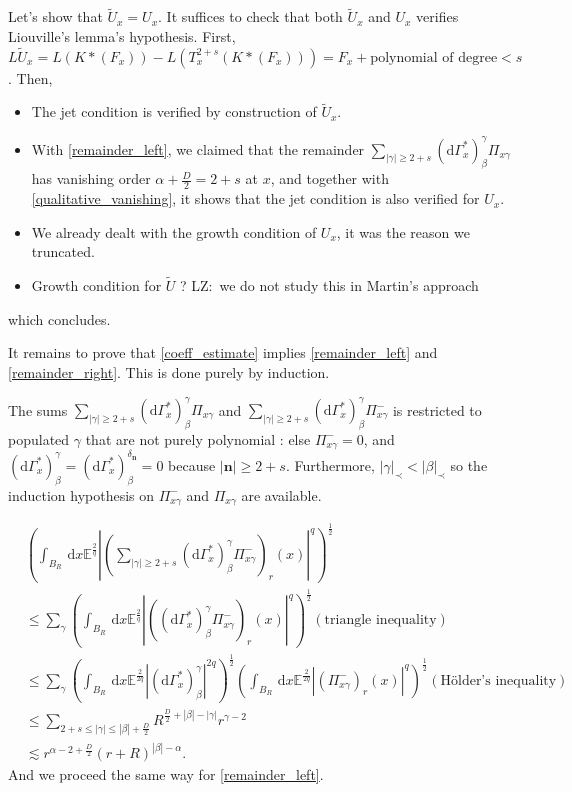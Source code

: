 \documentclass[12pt, a4paper]{article}
\newcommand{\dG}{\mathrm{d}\Gamma^*_x}
\newcommand{\mn}{\mathbf{n}}
\newcommand{\abs}[1]{\left| #1 \right|}
\newcommand{\dd}{\,\mathrm{d}}
\newcommand{\lz}[1]{\begingroup\color{blue}LZ:\ #1\endgroup}
\begin{document}
Let's show that $\tilde{U}_x = U_x$. It suffices to check that both $\tilde{U}_x$ and $U_x$ verifies Liouville's lemma's hypothesis.
First, $L\tilde{U}_x = L(K*(F_x)) - L(T_x^{2+s}(K*(F_x)))  = F_x + \text{polynomial of degree}< s$.
Then,
\begin{itemize}
    \item The jet condition is verified by construction of $\tilde{U}_x$.
    \item With \eqref{remainder_left}, we claimed that the remainder $\sum_{\abs{\gamma} \geq 2+s} (\dG)_\beta^\gamma \Pi_{x\gamma}$ has vanishing order $\alpha+\frac{D}{2} = 2+s$ at $x$, and together with \eqref{qualitative_vanishing}, it shows that the jet condition is also verified for $U_x$.
    \item We already dealt with the growth condition of $U_x$, it was the reason we truncated.
    \item Growth condition for $\tilde{U}$ ? \lz{we do not study this in Martin's approach}
\end{itemize}
which concludes.

It remains to prove that \eqref{coeff_estimate} implies \eqref{remainder_left} and \eqref{remainder_right}.
This is done purely by induction.

The sums $\sum_{\abs{\gamma}\geq 2+s}(\dG)_\beta^\gamma \Pi_{x\gamma}$ and $\sum_{\abs{\gamma}\geq 2+s}(\dG)_\beta^\gamma \Pi_{x\gamma}^-$ is restricted to populated $\gamma$ that are not purely polynomial : else $\Pi_{x\gamma}^- = 0$, and $(\dG)^\gamma_\beta = (\dG)^{\delta_\mn}_\beta = 0$ because $\abs{\mn}\geq 2+s$.
Furthermore, $\abs{\gamma}_\prec < \abs{\beta}_\prec$ so the induction hypothesis on $\Pi^-_{x\gamma}$ and $\Pi_{x\gamma}$ are available.

\begin{align*}
   & \left(\int_{B_R} \dd x \mathbb{E}^{\frac{2}{q}}\abs{(\sum_{\abs{\gamma}\geq 2+s} (\dG)_\beta^\gamma \Pi_{x\gamma}^-)_r(x)}^q \right)^\frac{1}{2} 
   \\&\leq \sum_{\gamma}     \left(\int_{B_R} \dd x \mathbb{E}^{\frac{2}{q}}\abs{((\dG)_\beta^\gamma \Pi_{x\gamma}^-)_r(x)}^q \right)^\frac{1}{2} (\text{triangle inequality})\\
    &\leq \sum_{\gamma}  \left(\int_{B_R} \dd x \mathbb{E}^{\frac{2}{2q}}\abs{(\dG)_\beta^\gamma}^{2q} \right)^\frac{1}{2}    \left(\int_{B_R} \dd x \mathbb{E}^{\frac{2}{2q}}\abs{(\Pi_{x\gamma}^-)_r(x)}^q \right)^\frac{1}{2} (\text{Hölder's inequality}) \\
    &\leq \sum_{2+s \leq \abs{\gamma} \leq \abs{\beta}+\frac{D}{2}} R^{\frac{D}{2}+\abs{\beta} - \abs{\gamma}} r^{\gamma - 2} \\
    &\lesssim r^{\alpha - 2 +\frac{D}{2}}(r+R)^{\abs{\beta}-\alpha}.
\end{align*}
And we proceed the same way for \eqref{remainder_left}.

\printbibliography
\end{document}
